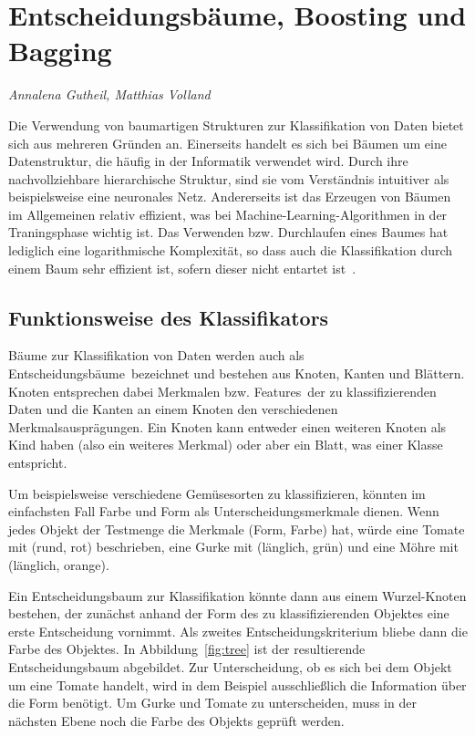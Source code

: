\section{Entscheidungsbäume, Boosting und Bagging}
\label{mainsec:trees}
\textit{Annalena Gutheil, Matthias Volland}

Die Verwendung von baumartigen Strukturen zur Klassifikation von Daten bietet sich aus mehreren Gründen an. 
Einerseits handelt es sich bei Bäumen um eine Datenstruktur, die häufig in der Informatik verwendet wird. Durch ihre nachvollziehbare hierarchische Struktur, sind sie vom Verständnis intuitiver als beispielsweise eine neuronales Netz.
Andererseits ist das Erzeugen von Bäumen im Allgemeinen relativ effizient, was bei Machine-Learning-Algorithmen 
in der Traningsphase wichtig ist. Das Verwenden bzw. Durchlaufen eines Baumes hat lediglich eine logarithmische Komplexität, 
so dass auch die Klassifikation durch einem Baum sehr effizient ist, sofern dieser nicht entartet ist~\cite{Marsland}. 

\subsection{Funktionsweise des Klassifikators}

Bäume zur Klassifikation von Daten werden auch als \glqq Entscheidungsbäume\grqq\ bezeichnet und bestehen aus Knoten, Kanten und Blättern. Knoten entsprechen dabei Merkmalen bzw. \glqq Features\grqq\ der zu klassifizierenden Daten und die Kanten an einem Knoten den verschiedenen Merkmalsausprägungen. 
Ein Knoten kann entweder einen weiteren Knoten als Kind haben (also ein weiteres Merkmal) oder aber ein Blatt, was einer Klasse entspricht.

Um beispielsweise verschiedene Gemüsesorten zu klassifizieren, könnten im einfachsten Fall Farbe und Form als Unterscheidungsmerkmale dienen. Wenn jedes Objekt der Testmenge die Merkmale (Form, Farbe) hat, würde eine Tomate mit (rund, rot) beschrieben, eine Gurke mit (länglich, grün) und eine Möhre mit (länglich, orange).

Ein Entscheidungsbaum zur Klassifikation könnte dann aus einem Wurzel-Knoten bestehen, der zunächst anhand der Form 
des zu klassifizierenden Objektes eine erste Entscheidung vornimmt. Als zweites Entscheidungskriterium bliebe dann die Farbe des Objektes. In Abbildung~\ref{fig:tree} ist der resultierende Entscheidungsbaum abgebildet. Zur Unterscheidung, ob es sich bei dem Objekt um eine Tomate handelt, wird in dem Beispiel ausschließlich die Information über die Form benötigt. Um Gurke und Tomate zu unterscheiden, muss in der nächsten Ebene noch die Farbe des Objekts geprüft werden.

